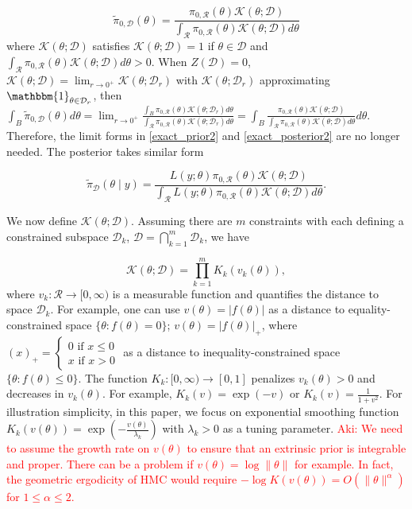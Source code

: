 \documentclass[10pt]{article}
\newcommand{\leo}[1]{{\color{blue}{Leo: #1}}}
\newcommand{\aki}[1]{\textcolor{red}{Aki: #1}}
\newcommand{\mc}[1]{\mathcal{#1}}
\DeclareMathOperator{\1}{\mathbbm{1}}
\begin{document}
\begin{equation}
\label{extrinsic_prior}
	\tilde{\pi}_{0,\mc D}(\theta) = \frac{ \pi_{0,\mc R}(\theta) \mc{K}( \theta; \mc D) }{ \int_{\mc R} \pi_{0,\mc R}(\theta) \mc{K}(\theta; \mc D)d\theta }
\end{equation}
where $\mc K(\theta; \mc D)$ satisfies $\mc K(\theta; \mc D)=1$ if $\theta\in \mc D$ and $ \int_{\mc R} \pi_{0,\mc R}(\theta) \mc{K}(\theta; \mc D)d\theta>0$. When $Z(\mc D)=0$, $\mc K(\theta;  \mc D)=\lim_{r\rightarrow 0^+}\mc K(\theta;  \mc D_r)$ with $\mc{K}(\theta; \mc D_r)$ approximating $\mathbbm{1}_{\theta\in  \mc D_r}$, then $
	\int_{B} \tilde{\pi}_{0,\mc D}(\theta) d \theta =  \lim_{r\rightarrow 0^+}\frac{\int_{B}  \pi_{0,\mc R}(\theta) \mc{K}( \theta; \mc D_r)d\theta }{ \int_{\mc R} \pi_{0,\mc R}(\theta) \mc{K}(\theta; \mc D_r)d\theta } = 	\int_{B} \frac{ \pi_{0,\mc R}(\theta) \mc{K}( \theta; \mc D) }{ \int_{\mc R} \pi_{0,\mc R}(\theta) \mc{K}(\theta; \mc D)d\theta } d\theta$. Therefore, the limit forms in \eqref{exact_prior2} and \eqref{exact_posterior2} are no longer needed. The posterior takes similar form

\begin{equation}
\label{extrinsic_posterior}
	\tilde{\pi}_{\mc D}(\theta \mid y) = \frac{ L(y;\theta)\pi_{0,\mc R}(\theta) \mc{K}( \theta; \mc D) }{ \int_{\mc R} L(y;\theta)\pi_{0,\mc R}(\theta) \mc{K}(\theta; \mc D)d\theta }.
\end{equation}

We now define $\mc K(\theta;\mc D)$. Assuming there are $m$ constraints with each defining a constrained subspace $\mc D_k$, $\mc D = \bigcap_{k=1}^m\mc D_k$, we have

\begin{equation}
\label{smoothing}
\mc K(\theta; \mc D)= \prod_{k=1}^m K_k(v_k(\theta)),
\end{equation}
where $v_k: \mc R \rightarrow [0,\infty)$ is a measurable function and quantifies the distance to space $\mc D_k$. For example, one can use $v(\theta)=|f(\theta)|$ as a distance to equality-constrained space  $\{\theta:f(\theta)=0\}$; $v(\theta)=|f(\theta)|_+$, where $(x)_+ = \left\{\begin{array}{cc}  0 \text{ if } x\le 0 \\ x \text{ if } x> 0\end{array}\right.$ as a distance to inequality-constrained space  $\{\theta:f(\theta) \le 0\}$. The function $K_k:[0,\infty)\rightarrow [0,1]$ penalizes $v_k(\theta)>0$ and decreases in $v_k(\theta)$. For example, $K_k(v)=\exp(-v)$ or $K_k(v)=\frac{1}{1+v^2}$. For illustration simplicity, in this paper, we focus on exponential smoothing function $K_k(v(\theta))=\exp(-\frac{v(\theta)}{\lambda_k})$ with $\lambda_k>0$ as a tuning parameter. \aki{We need to assume the growth rate on $v(\theta)$ to ensure that an extrinsic prior is integrable and proper. There can be a problem if $v(\theta) = \log \| \theta \|$ for example. In fact, the geometric ergodicity of HMC would require $- \log K(v(\theta)) = O(\| \theta \|^\alpha)$ for $1 \leq \alpha \leq 2$.} \leo{can you provide the justification or reference for this result?}
\end{document}
